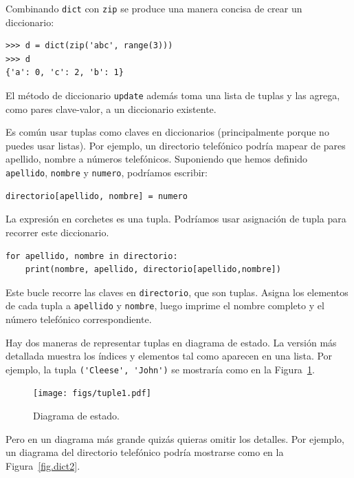 \documentclass[10pt]{book}
\begin{document}
Combinando {\tt dict} con {\tt zip} se produce una manera concisa
de crear un diccionario:

\begin{verbatim}
>>> d = dict(zip('abc', range(3)))
>>> d
{'a': 0, 'c': 2, 'b': 1}
\end{verbatim}
%
El método de diccionario {\tt update} además toma una lista de tuplas
y las agrega, como pares clave-valor, a un diccionario existente.

Es común usar tuplas como claves en diccionarios (principalmente porque
no puedes usar listas).  Por ejemplo, un directorio telefónico podría mapear
de pares apellido, nombre a números telefónicos.  Suponiendo
que hemos definido {\tt apellido}, {\tt nombre} y {\tt numero},
podríamos escribir:

\begin{verbatim}
directorio[apellido, nombre] = numero
\end{verbatim}
%
La expresión en corchetes es una tupla.  Podríamos usar asignación
de tupla para recorrer este diccionario.

\begin{verbatim}
for apellido, nombre in directorio:
    print(nombre, apellido, directorio[apellido,nombre])
\end{verbatim}
%
Este bucle recorre las claves en {\tt directorio}, que son tuplas.  Asigna
los elementos de cada tupla a {\tt apellido} y {\tt nombre}, luego
imprime el nombre completo y el número telefónico correspondiente.

Hay dos maneras de representar tuplas en diagrama de estado.  La versión
más detallada muestra los índices y elementos tal como aparecen en
una lista.  Por ejemplo, la tupla \verb"('Cleese', 'John')" se mostraría
como en la Figura~\ref{fig.tuple1}.

\begin{figure}
\centerline
{\texttt{[image: figs/tuple1.pdf]}}
\caption{Diagrama de estado.}
\label{fig.tuple1}
\end{figure}

Pero en un diagrama más grande quizás quieras omitir los
detalles.  Por ejemplo, un diagrama del directorio telefónico podría
mostrarse como en la Figura~\ref{fig.dict2}.
\end{document}
